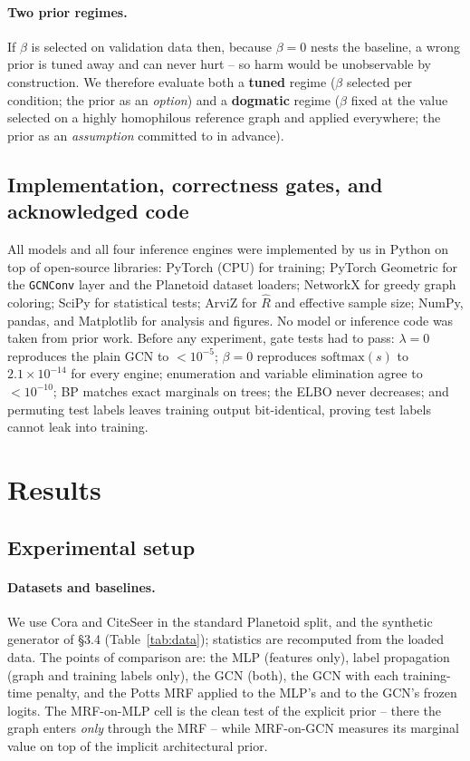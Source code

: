 \documentclass{article}
\begin{document}
\paragraph{Two prior regimes.} If $\beta$ is selected on validation data then, because
$\beta=0$ nests the baseline, a wrong prior is tuned away and can never hurt -- so harm would be
unobservable by construction. We therefore evaluate both a \textbf{tuned} regime ($\beta$
selected per condition; the prior as an \emph{option}) and a \textbf{dogmatic} regime ($\beta$
fixed at the value selected on a highly homophilous reference graph and applied everywhere; the
prior as an \emph{assumption} committed to in advance).

\subsection{Implementation, correctness gates, and acknowledged code}

All models and all four inference engines were implemented by us in Python on top of open-source
libraries: PyTorch (CPU) for training; PyTorch Geometric for the \texttt{GCNConv} layer and the
Planetoid dataset loaders; NetworkX for greedy graph coloring; SciPy for statistical tests;
ArviZ for $\hat{R}$ and effective sample size; NumPy, pandas, and Matplotlib for analysis and
figures. No model or inference code was taken from prior work. Before any experiment, gate
tests had to pass: $\lambda{=}0$ reproduces the plain GCN to $<10^{-5}$; $\beta{=}0$ reproduces
$\mathrm{softmax}(s)$ to $2.1{\times}10^{-14}$ for every engine; enumeration and variable
elimination agree to $<10^{-10}$; BP matches exact marginals on trees; the ELBO never decreases;
and permuting test labels leaves training output bit-identical, proving test labels cannot leak
into training.

\section{Results}

\subsection{Experimental setup}

\paragraph{Datasets and baselines.} We use Cora and CiteSeer
\citep{sen2008collective,yang2016revisiting} in the standard Planetoid split, and the synthetic
generator of \S3.4 (Table~\ref{tab:data}); statistics are recomputed from the loaded data. The
points of comparison are: the MLP (features only), label propagation (graph and training labels
only), the GCN (both), the GCN with each training-time penalty, and the Potts MRF applied to the
MLP's and to the GCN's frozen logits. The MRF-on-MLP cell is the clean test of the explicit
prior -- there the graph enters \emph{only} through the MRF -- while MRF-on-GCN measures its
marginal value on top of the implicit architectural prior.
\end{document}
